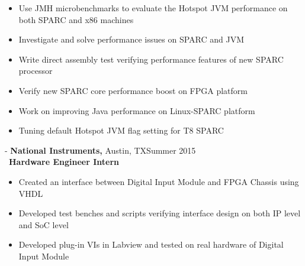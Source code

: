\documentclass[11pt]{res}
\begin{document}
\begin{resume}
 \begin{itemize}[leftmargin=-0.1in]
   \item Use JMH microbenchmarks to evaluate the Hotspot JVM performance on both SPARC and x86 machines\vspace{-5pt}
   \item Investigate and solve performance issues on SPARC and JVM  \vspace{-5pt}
   \item Write direct assembly test verifying performance features of new SPARC processor \vspace{-5pt}
   \item Verify new SPARC core performance boost on FPGA platform \vspace{-5pt}
   \item Work on improving Java performance on Linux-SPARC platform \vspace{-5pt}
   \item Tuning default Hotspot JVM flag setting for T8 SPARC \vspace{-5pt}
 \end{itemize}

\vspace{-10pt}

 -\sectionwidth \resumewidth
{\textbf{National Instruments,}  Austin, TX\hfill Summer 2015} \hspace{-0.58in}\vspace{-0mm}\\\
  \textbf{Hardware Engineer Intern} \\
 \vspace{-14pt}

 \begin{itemize}[leftmargin=-0.1in]
   
  \item Created an interface between Digital Input Module and FPGA Chassis using VHDL\vspace{-5pt}
  \item Developed test benches and scripts verifying interface design on both IP level and SoC level \vspace{-5pt}
  \item Developed plug-in VIs in Labview and tested on real hardware of Digital Input Module\\
   \end{itemize}\vspace{-28pt}
   
   

\end{resume}
\end{document}
